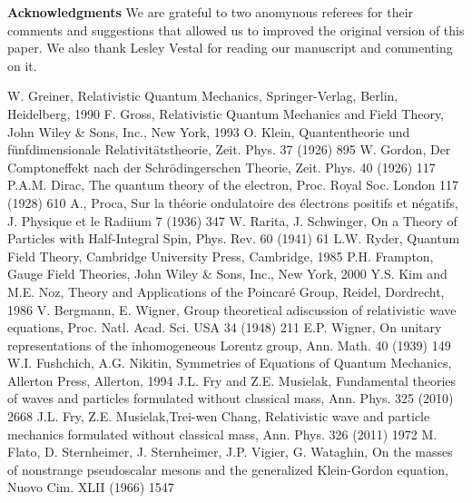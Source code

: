\documentclass[12pt]{iopart}
\begin{document}
\bigskip\noindent
{\bf Acknowledgments}
We are grateful to two anomynous referees for their comments and suggestions
that allowed us to improved the original version of this paper.  We also thank 
Lesley Vestal for reading our manuscript and commenting on it.
%
\begin{thebibliography}{}

 W. Greiner, Relativistic Quantum Mechanics, Springer-Verlag, 
                  Berlin, Heidelberg, 1990
 F. Gross, Relativistic Quantum Mechanics and Field Theory, 
                 John Wiley \& Sons, Inc., New York, 1993 
 O. Klein, Quantentheorie und f\"unfdimensionale Relativit\"atstheorie, Zeit. Phys. 37 (1926) 895
 W. Gordon, Der Comptoneffekt nach der Schr\"odingerschen Theorie, Zeit. Phys. 40 (1926) 117
 P.A.M. Dirac, The quantum theory of the electron, Proc. Royal Soc. London 117 (1928) 610
 A., Proca, Sur la th\'eorie ondulatoire des \'electrons positifs et n\'egatifs, J. Physique et le 
                 Radiium 7 (1936) 347
 W. Rarita, J. Schwinger, On a Theory of Particles with Half-Integral Spin, Phys. Rev. 60 (1941) 61
 L.W. Ryder, Quantum Field Theory, Cambridge University Press,
                  Cambridge, 1985
 P.H. Frampton, Gauge Field Theories, John Wiley \& Sons, Inc., 
                  New York, 2000
 Y.S. Kim and M.E. Noz, Theory and Applications of the 
                  Poincar\'e Group, Reidel, Dordrecht, 1986
 V. Bergmann, E. Wigner, Group theoretical adiscussion of relativistic wave equations,
                   Proc. Natl. Acad. Sci. USA 34 (1948) 211
 E.P. Wigner, On unitary representations of the inhomogeneous Lorentz group, 
                   Ann. Math. 40 (1939) 149
 W.I. Fushchich, A.G. Nikitin, Symmetries of Equations of Quantum
                    Mechanics, Allerton Press, Allerton, 1994
 J.L. Fry and Z.E. Musielak, Fundamental theories of waves and particles formulated 
                   without classical mass, Ann. Phys. 325 (2010) 2668
 J.L. Fry, Z.E. Musielak,Trei-wen Chang,  Relativistic wave and particle mechanics
                   formulated without classical mass, Ann. Phys. 326 (2011) 1972
 M. Flato, D. Sternheimer, J. Sternheimer, J.P. Vigier, G. Wataghin, On the 
                   masses of nonstrange pseudoscalar mesons and the generalized Klein-Gordon
                   equation, Nuovo Cim. XLII (1966) 1547

\end{thebibliography}
\end{document}
